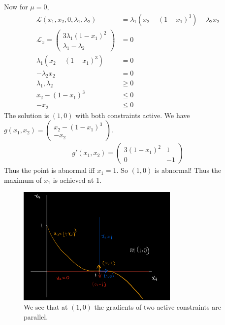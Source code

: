 \documentclass[12pt]{article}
\begin{document}
\begin{problem}[3]
Now for $ \mu=0$,
\begin{align*}
	\mathscr{L}(x_1,x_2,0,\lambda_1,\lambda_2) &= \lambda_1(x_2-(1-x_1)^3)-\lambda_2 x_2\\
	\mathscr{L}_x = \begin{pmatrix} 3\lambda_1(1-x_1)^2\\ \lambda_1-\lambda_2 \end{pmatrix} &=0 \\
	\lambda_1(x_2-(1-x_1)^3) &= 0 \\
	-\lambda_2 x_2 &= 0 \\
	\lambda_1,\lambda_2 &\geq 0\\
	x_2-(1-x_1)^3 &\leq 0\\
	-x_2 &\leq 0 
\end{align*}
The solution is $ (1,0)$ with both constraints active. We have $ g(x_1,x_2) = \begin{pmatrix} x_2 - (1-x_1)^3\\-x_2 \end{pmatrix} $.
\begin{align*}
	g'(x_1,x_2) = \begin{pmatrix} 3(1-x_1)^2&1\\0&-1 \end{pmatrix} 
\end{align*}
Thus the point is abnormal iff $ x_1=1$. So $ (1,0)$ is abnormal! Thus the maximum of  $ x_1$ is achieved at 1.
~\begin{figure}[H]
	\centering
	\includegraphics[width=0.7\textwidth]{./figures/gradient.png}
	\caption{We see that at $ (1,0)$ the gradients of two active constraints are parallel.}
\end{figure}
\end{problem}
\end{document}
